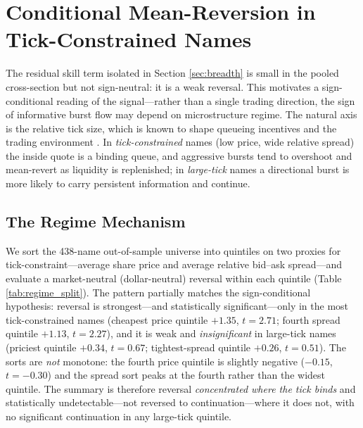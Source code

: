 \documentclass[11pt]{article}
\begin{document}
\section{Conditional Mean-Reversion in Tick-Constrained Names}
\label{sec:reversion}
The residual skill term isolated in Section \ref{sec:breadth} is small in the pooled cross-section but not sign-neutral: it is a weak reversal. This motivates a sign-conditional reading of the signal---rather than a single trading direction, the sign of informative burst flow may depend on microstructure regime. The natural axis is the relative tick size, which is known to shape queueing incentives and the trading environment \citep{yaoye2018,ohara2019}. In \emph{tick-constrained} names (low price, wide relative spread) the inside quote is a binding queue, and aggressive bursts tend to overshoot and mean-revert as liquidity is replenished; in \emph{large-tick} names a directional burst is more likely to carry persistent information and continue.

\subsection{The Regime Mechanism}
We sort the 438-name out-of-sample universe into quintiles on two proxies for tick-constraint---average share price and average relative bid--ask spread---and evaluate a market-neutral (dollar-neutral) reversal within each quintile (Table \ref{tab:regime_split}). The pattern partially matches the sign-conditional hypothesis: reversal is strongest---and statistically significant---only in the most tick-constrained names (cheapest price quintile $+1.35$, $t=2.71$; fourth spread quintile $+1.13$, $t=2.27$), and it is weak and \emph{insignificant} in large-tick names (priciest quintile $+0.34$, $t=0.67$; tightest-spread quintile $+0.26$, $t=0.51$). The sorts are \emph{not} monotone: the fourth price quintile is slightly negative ($-0.15$, $t=-0.30$) and the spread sort peaks at the fourth rather than the widest quintile. The summary is therefore reversal \emph{concentrated where the tick binds} and statistically undetectable---not reversed to continuation---where it does not, with no significant continuation in any large-tick quintile.
\end{document}
